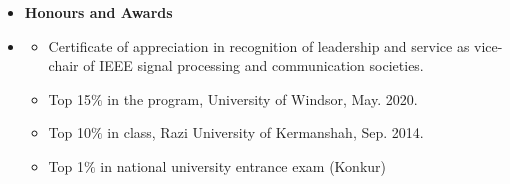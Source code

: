 
\begin {itemize} \item [] {\bf \Large    Honours and Awards }  \vspace{-1.5em}
\item []  {\bf \hrulefill } \mdseries \normalsize 
    \begin {itemize}
        \item [$\bullet$]  {\normalsize Certificate of appreciation in recognition of leadership and service as vice-chair of IEEE signal processing and communication societies.}
        \item [$\bullet$]  { \normalsize Top 15$\%$ in the program, University of Windsor, May. 2020.} 
         \item [$\bullet$]  { \normalsize Top 10$\%$ in class, Razi University of Kermanshah, Sep. 2014.} 
          \item [$\bullet$]  { \normalsize Top 1$\%$ in national university entrance exam (Konkur)} 
    \end {itemize}
\end {itemize}





